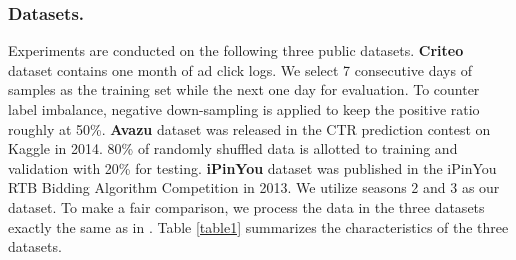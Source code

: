 \documentclass[letterpaper]{article} \usepackage{aaai21}  \usepackage{times}  \usepackage{helvet} \usepackage{courier}  \usepackage[hyphens]{url}  \usepackage{graphicx} \urlstyle{rm} \def\UrlFont{\rm}  \usepackage{natbib}  \usepackage{caption} \frenchspacing  \setlength{\pdfpagewidth}{8.5in}  \setlength{\pdfpageheight}{11in}  \usepackage{graphicx}
\begin{document}
\subsubsection{Datasets.} Experiments are conducted on the following three public datasets. \textbf{Criteo} dataset contains one month of ad click logs. We select 7 consecutive days of samples as the training set while the next one day for evaluation. To counter label imbalance, negative down-sampling is applied to keep the positive ratio roughly at 50\%. \textbf{Avazu} dataset was released in the CTR prediction contest on Kaggle in 2014. 80\% of randomly shuffled data is allotted to training and validation with 20\% for testing. \textbf{iPinYou} dataset was published in the iPinYou RTB Bidding Algorithm Competition in 2013. We utilize seasons 2 and 3 as our dataset. To make a fair comparison, we process the data in the three datasets exactly the same as in . Table \ref{table1} summarizes the characteristics of the three datasets.
\end{document}
